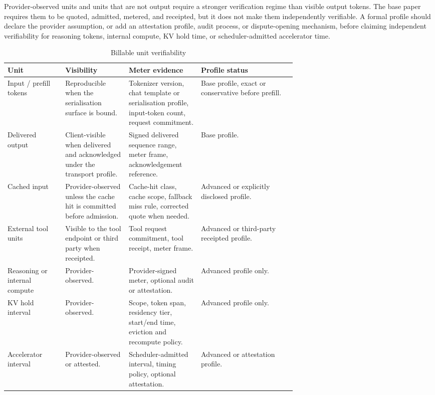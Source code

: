 \documentclass[11pt]{article}
\begin{document}
Provider-observed units and units that are not output require a stronger verification regime than visible output tokens. The base paper requires them to be quoted, admitted, metered, and receipted, but it does not make them independently verifiable. A formal profile should declare the provider assumption, or add an attestation profile, audit process, or dispute-opening mechanism, before claiming independent verifiability for reasoning tokens, internal compute, KV hold time, or scheduler-admitted accelerator time.

\begin{table}[H]
\centering
\caption{Billable unit verifiability}
\label{tab:billable-unit-verifiability}
\footnotesize
\begin{tabularx}{\linewidth}{>{\raggedright\arraybackslash}p{0.20\linewidth} >{\raggedright\arraybackslash}p{0.22\linewidth} >{\raggedright\arraybackslash}p{0.25\linewidth} >{\raggedright\arraybackslash}X}
\toprule
\textbf{Unit} & \textbf{Visibility} & \textbf{Meter evidence} & \textbf{Profile status} \\
\midrule
Input / prefill tokens & Reproducible when the serialisation surface is bound. & Tokenizer version, chat template or serialisation profile, input-token count, request commitment. & Base profile, exact or conservative before prefill. \\
Delivered output & Client-visible when delivered and acknowledged under the transport profile. & Signed delivered sequence range, meter frame, acknowledgement reference. & Base profile. \\
Cached input & Provider-observed unless the cache hit is committed before admission. & Cache-hit class, cache scope, fallback miss rule, corrected quote when needed. & Advanced or explicitly disclosed profile. \\
External tool units & Visible to the tool endpoint or third party when receipted. & Tool request commitment, tool receipt, meter frame. & Advanced or third-party receipted profile. \\
Reasoning or internal compute & Provider-observed. & Provider-signed meter, optional audit or attestation. & Advanced profile only. \\
KV hold interval & Provider-observed. & Scope, token span, residency tier, start/end time, eviction and recompute policy. & Advanced profile only. \\
Accelerator interval & Provider-observed or attested. & Scheduler-admitted interval, timing policy, optional attestation. & Advanced or attestation profile. \\
\bottomrule
\end{tabularx}
\end{table}
\end{document}
